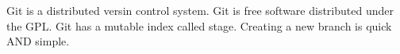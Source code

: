 ﻿Git is a distributed  versin control system.
Git is free software distributed under the GPL.
Git has a mutable index called stage.
Creating a new branch is quick AND simple.